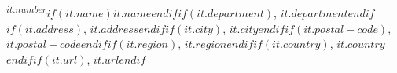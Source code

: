 \textsuperscript{$it.number$}$if(it.name)$$it.name$$endif$$if(it.department)$, $it.department$$endif$$if(it.address)$, $it.address$$endif$$if(it.city)$, $it.city$$endif$$if(it.postal-code)$, $it.postal-code$$endif$$if(it.region)$, $it.region$$endif$$if(it.country)$, $it.country$$endif$$if(it.url)$, $it.url$$endif$